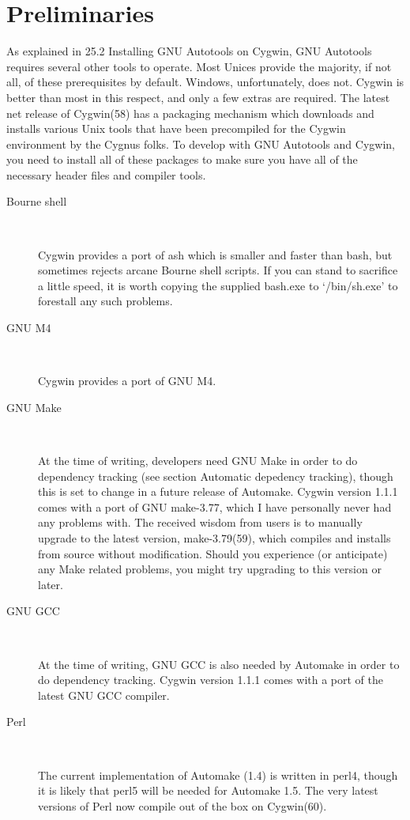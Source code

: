\section{Preliminaries}

As explained in 25.2 Installing GNU Autotools on Cygwin, GNU Autotools requires several other tools to operate. Most Unices provide the majority, if not all, of these prerequisites by default. Windows, unfortunately, does not. Cygwin is better than most in this respect, and only a few extras are required. The latest net release of Cygwin(58) has a packaging mechanism which downloads and installs various Unix tools that have been precompiled for the Cygwin environment by the Cygnus folks. To develop with GNU Autotools and Cygwin, you need to install all of these packages to make sure you have all of the necessary header files and compiler tools. 

\begin{description}
\item[Bourne shell]
\

    Cygwin provides a port of ash which is smaller and faster than bash, but sometimes rejects arcane Bourne shell scripts. If you can stand to sacrifice a little speed, it is worth copying the supplied bash.exe to `/bin/sh.exe' to forestall any such problems.

\item[GNU M4]
\

    Cygwin provides a port of GNU M4.

\item[GNU Make]
\

    At the time of writing, developers need GNU Make in order to do dependency tracking (see section Automatic depedency tracking), though this is set to change in a future release of Automake. Cygwin version 1.1.1 comes with a port of GNU make-3.77, which I have personally never had any problems with. The received wisdom from users is to manually upgrade to the latest version, make-3.79(59), which compiles and installs from source without modification. Should you experience (or anticipate) any Make related problems, you might try upgrading to this version or later.

\item[GNU GCC]
\

    At the time of writing, GNU GCC is also needed by Automake in order to do dependency tracking. Cygwin version 1.1.1 comes with a port of the latest GNU GCC compiler.

\item[Perl]
\

    The current implementation of Automake (1.4) is written in perl4, though it is likely that perl5 will be needed for Automake 1.5. The very latest versions of Perl now compile out of the box on Cygwin(60).
\end{description}

